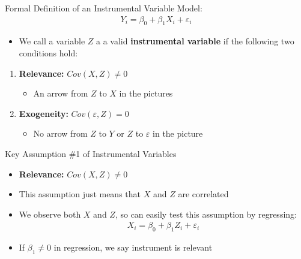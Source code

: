 \documentclass[aspectratio=169,11pt]{beamer}
\begin{document}
\begin{frame}{Formal Definition of an Instrumental Variable}
Model:
\begin{align*}
	Y_i = \beta_0 + \beta_1 X_i + \varepsilon_i
\end{align*}

\begin{itemize}
\item We call a variable $Z$ a a valid {\bf instrumental variable} if the following two conditions hold:
\end{itemize}
\begin{enumerate}
	\item {\bf Relevance:} $Cov(X,Z)\ne 0$
		\begin{itemize}
			\item An arrow from $Z$ to $X$ in the pictures
		\end{itemize}
\medskip
	\item {\bf Exogeneity:} $Cov(\varepsilon,Z)= 0$
		\begin{itemize}
			\item No arrow from $Z$ to $Y$ or $Z$ to $\varepsilon$ in the picture
		\end{itemize}
\end{enumerate}
\end{frame}

\begin{frame}{Key Assumption \#1 of Instrumental Variables}
\begin{itemize}
	\item {\bf Relevance:} $Cov(X,Z)\ne 0$
\medskip
\item This assumption just means that $X$ and $Z$ are correlated
\medskip
\item We observe both $X$ and $Z$, so can easily test this assumption by regressing:
	\begin{align*}
	X_i = \beta_0 + \beta_1 Z_i + \varepsilon_i
	\end{align*}
\item If $\beta_1 \neq 0$ in regression, we say instrument is relevant
\end{itemize}
\end{frame}
\end{document}
